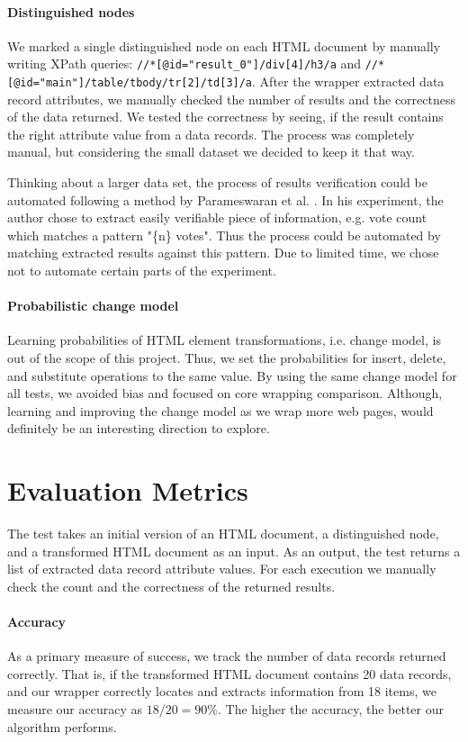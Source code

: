 \paragraph{Distinguished nodes} We marked a single distinguished node on each HTML document by manually writing XPath queries: \texttt{//*[@id="result\_0"]/div[4]/h3/a} and \texttt{//*[@id="main"]/table/tbody/tr[2]/td[3]/a}. After the wrapper extracted data record attributes, we manually checked the number of results and the correctness of the data returned. We tested the correctness by seeing, if the result contains the right attribute value from a data records. The process was completely manual, but considering the small dataset we decided to keep it that way.

Thinking about a larger data set, the process of results verification could be automated following a method by Parameswaran et al. \cite{DBLP:journals/pvldb/ParameswaranDGR11}. In his experiment, the author chose to extract easily verifiable piece of information, e.g. vote count which matches a pattern "\{n\} votes". Thus the process could be automated by matching extracted results against this pattern. Due to limited time, we chose not to automate certain parts of the experiment.

\paragraph{Probabilistic change model} Learning probabilities of HTML element transformations, i.e. change model, is out of the scope of this project. Thus, we set the probabilities for insert, delete, and substitute operations to the same value. By using the same change model for all tests, we avoided bias and focused on core wrapping comparison. Although, learning and improving the change model as we wrap more web pages, would definitely be an interesting direction to explore.


\section{Evaluation Metrics}

The test takes an initial version of an HTML document, a distinguished node, and a transformed HTML document as an input. As an output, the test returns a list of extracted data record attribute values. For each execution we manually check the count and the correctness of the returned results.

\paragraph{Accuracy} As a primary measure of success, we track the number of data records returned correctly. That is, if the transformed HTML document contains 20 data records, and our wrapper correctly locates and extracts information from 18 items, we measure our accuracy as $18 / 20 = 90\%$. The higher the accuracy, the better our algorithm performs.

